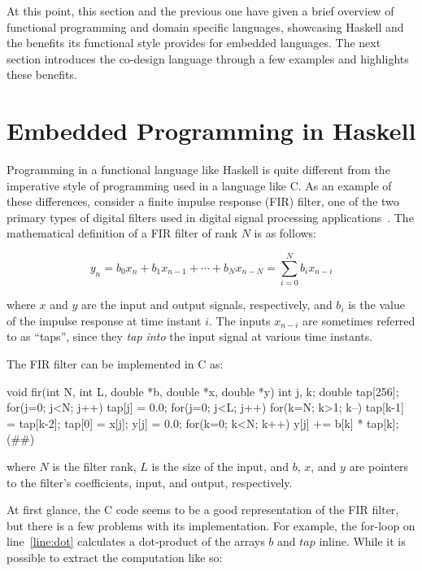 \documentclass[../paper.tex]{subfiles}
\begin{document}
At this point, this section and the previous one have given a brief overview of functional programming and domain specific languages, showcasing Haskell and the benefits its functional style provides for embedded languages. The next section introduces the co-design language through a few examples and highlights these benefits.

\section{Embedded Programming in Haskell}
\label{embedded}

Programming in a functional language like Haskell is quite different from the imperative style of programming used in a language like C. As an example of these differences, consider a finite impulse response (FIR) filter, one of the two primary types of digital filters used in digital signal processing applications~\cite{oppenheim1989}. The mathematical definition of a FIR filter of rank $N$ is as follows:

\begin{equation}
y_{n} = b_{0} x_{n} + b_{1} x_{n-1} + \cdots + b_{N} x_{n-N} = \sum_{i=0}^{N} b_{i} x_{n-i}
\end{equation}
\vspace{1mm}

\noindent where $x$ and $y$ are the input and output signals, respectively, and $b_i$ is the value of the impulse response at time instant $i$. The inputs $x_{n-i}$ are sometimes referred to as ``taps'', since they \textit{tap into} the input signal at various time instants. 

The FIR filter can be implemented in C as:

\begin{code}
void fir(int N, int L, double *b, double *x, double *y) {
 int j, k;
 double tap[256];
 for(j=0; j<N; j++) tap[j] = 0.0;
 for(j=0; j<L; j++) {
  for(k=N; k>1; k--) tap[k-1] = tap[k-2];
  tap[0] = x[j];
  y[j] = 0.0;
  for(k=0; k<N; k++) y[j] += b[k] * tap[k]; (#\label{line:dot}#)
 }
}
\end{code}

\noindent where $N$ is the filter rank, $L$ is the size of the input, and $b$, $x$, and $y$ are pointers to the filter's coefficients, input, and output, respectively.

At first glance, the C code seems to be a good representation of the FIR filter, but there is a few problems with its implementation. For example, the for-loop on line~\ref{line:dot} calculates a dot-product of the arrays $b$ and $tap$ inline. While it is possible to extract the computation like so:
\end{document}
